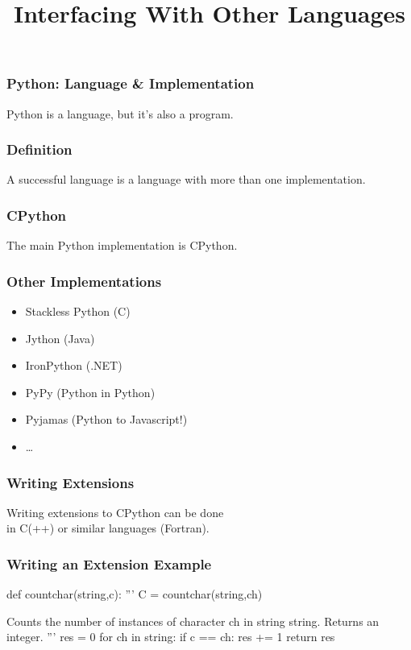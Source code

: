
\title{Interfacing With Other Languages}

\frame{\maketitle}

\begin{frame}[fragile]
\frametitle{Python: Language \& Implementation}
Python is a language, but it's also a program.
\end{frame}

\begin{frame}[fragile]
\frametitle{Definition}

A \alert{successful language} is a language with more than one implementation.

\end{frame}

\begin{frame}[fragile]
\frametitle{CPython}
The main Python implementation is \alert{CPython}.
\end{frame}

\begin{frame}[fragile]
\frametitle{Other Implementations}
\begin{itemize}
\item Stackless Python (C)
\item Jython (Java)
\item IronPython (.NET)
\item PyPy (Python in Python)
\item Pyjamas (Python to Javascript!)
\item \ldots
\end{itemize}
\end{frame}

\begin{frame}[fragile]
\frametitle{Writing Extensions}
Writing extensions to CPython can be done\\
in C(++) or similar languages (Fortran).
\end{frame}

\begin{frame}[fragile]
\frametitle{Writing an Extension Example}

\begin{python}
def countchar(string,c):
    '''
    C = countchar(string,ch)

    Counts the number of instances of character ch
    in string string. Returns an integer.
    '''
    res = 0
    for ch in string:
        if c == ch:
            res += 1
    return res
\end{python}
\end{frame}


